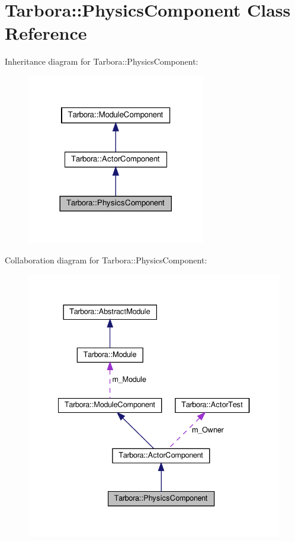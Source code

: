 \hypertarget{classTarbora_1_1PhysicsComponent}{}\section{Tarbora\+:\+:Physics\+Component Class Reference}
\label{classTarbora_1_1PhysicsComponent}


Inheritance diagram for Tarbora\+:\+:Physics\+Component\+:
\nopagebreak
\begin{figure}[H]
\begin{center}
\leavevmode
\includegraphics[width=221pt]{classTarbora_1_1PhysicsComponent__inherit__graph}
\end{center}
\end{figure}


Collaboration diagram for Tarbora\+:\+:Physics\+Component\+:
\nopagebreak
\begin{figure}[H]
\begin{center}
\leavevmode
\includegraphics[width=334pt]{classTarbora_1_1PhysicsComponent__coll__graph}
\end{center}
\end{figure}

